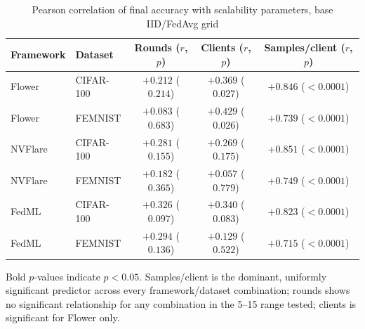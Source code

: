 \begin{table}[htbp]
\centering
\caption{Pearson correlation of final accuracy with scalability parameters, base IID/FedAvg grid}
\label{tab:correlations}
\begin{tabular}{llccc}
\toprule
Framework & Dataset & Rounds ($r$, $p$) & Clients ($r$, $p$) & Samples/client ($r$, $p$) \\
\midrule
Flower  & CIFAR-100 & $+0.212$ ($0.214$) & $+0.369$ ($\mathbf{0.027}$) & $+0.846$ ($<0.0001$) \\
Flower  & FEMNIST   & $+0.083$ ($0.683$) & $+0.429$ ($\mathbf{0.026}$) & $+0.739$ ($<0.0001$) \\
\addlinespace
NVFlare & CIFAR-100 & $+0.281$ ($0.155$) & $+0.269$ ($0.175$) & $+0.851$ ($<0.0001$) \\
NVFlare & FEMNIST   & $+0.182$ ($0.365$) & $+0.057$ ($0.779$) & $+0.749$ ($<0.0001$) \\
\addlinespace
FedML   & CIFAR-100 & $+0.326$ ($0.097$) & $+0.340$ ($0.083$) & $+0.823$ ($<0.0001$) \\
FedML   & FEMNIST   & $+0.294$ ($0.136$) & $+0.129$ ($0.522$) & $+0.715$ ($<0.0001$) \\
\bottomrule
\end{tabular}
\vspace{0.5em}
\footnotesize
Bold $p$-values indicate $p<0.05$. Samples/client is the dominant, uniformly significant
predictor across every framework/dataset combination; rounds shows no significant relationship
for any combination in the 5--15 range tested; clients is significant for Flower only.
\end{table}

